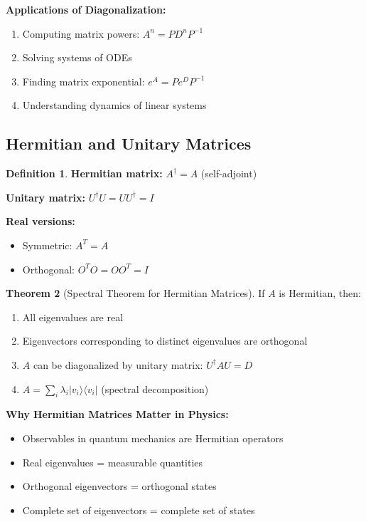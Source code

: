 \documentclass[12pt,a4paper]{article}
\theoremstyle{definition}
\newtheorem{theorem}{Theorem}[section]
\newtheorem{definition}[theorem]{Definition}
\begin{document}
\begin{importantbox}
\textbf{Applications of Diagonalization:}
\begin{enumerate}
    \item Computing matrix powers: $A^n = PD^nP^{-1}$
    \item Solving systems of ODEs
    \item Finding matrix exponential: $e^A = Pe^DP^{-1}$
    \item Understanding dynamics of linear systems
\end{enumerate}
\end{importantbox}

\subsection{Hermitian and Unitary Matrices}

\begin{definition}
\textbf{Hermitian matrix:} $A^\dagger = A$ (self-adjoint)

\textbf{Unitary matrix:} $U^\dagger U = UU^\dagger = I$

\textbf{Real versions:}
\begin{itemize}
    \item Symmetric: $A^T = A$
    \item Orthogonal: $O^TO = OO^T = I$
\end{itemize}
\end{definition}

\begin{theorem}[Spectral Theorem for Hermitian Matrices]
If $A$ is Hermitian, then:
\begin{enumerate}
    \item All eigenvalues are real
    \item Eigenvectors corresponding to distinct eigenvalues are orthogonal
    \item $A$ can be diagonalized by unitary matrix: $U^\dagger AU = D$
    \item $A = \sum_i \lambda_i |v_i\rangle\langle v_i|$ (spectral decomposition)
\end{enumerate}
\end{theorem}

\begin{importantbox}
\textbf{Why Hermitian Matrices Matter in Physics:}
\begin{itemize}
    \item Observables in quantum mechanics are Hermitian operators
    \item Real eigenvalues = measurable quantities
    \item Orthogonal eigenvectors = orthogonal states
    \item Complete set of eigenvectors = complete set of states
\end{itemize}
\end{importantbox}
\end{document}
